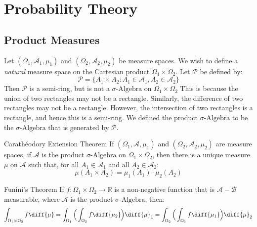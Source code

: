 \chapter{Probability Theory}
    \section{Product Measures}
        Let $(\Omega_{1},\mathcal{A}_{1},\mu_{1})$ and
        $(\Omega_{2},\mathcal{A}_{2},\mu_{2})$ be measure spaces. We
        wish to define a \textit{natural} measure space
        on the Cartesian product $\Omega_{1}\times\Omega_{2}$.
        Let $\mathcal{P}$ be defined by:
        \begin{equation}
            \mathcal{P}=
            \{A_{1}\times{A}_{2}:
                A_{1}\in\mathcal{A}_{1},A_{2}\in\mathcal{A}_{2}\}
        \end{equation}
        Then $\mathcal{P}$ is a semi-ring, but is not a
        $\sigma\textrm{-Algebra}$ on $\Omega_{1}\times\Omega_{2}$
        This is because the union of two rectangles may not be a
        rectangle. Similarly, the difference of two rectangles may not
        be a rectangle. However, the intersection of two rectangles is
        a rectangle, and hence this is a semi-ring.
        We defined the product $\sigma\textrm{-Algebra}$ to be the
        $\sigma\textrm{-Algebra}$ that is generated by $\mathcal{P}$. 
        \begin{ltheorem}{Carath\'{e}odory Extension Theorem}
            If $(\Omega_{1},\mathcal{A},\mu_{1})$ and
            $(\Omega_{2},\mathcal{A}_{2},\mu_{2})$ are measure spaces,
            if $\mathcal{A}$ is the product $\sigma\textrm{-Algebra}$
            on $\Omega_{1}\times\Omega_{2}$, then there is a unique
            measure $\mu$ on $\mathcal{A}$ such that, for all
            $A_{1}\in\mathcal{A}_{1}$ and all
            $A_{2}\in\mathcal{A}_{2}$:
            \begin{equation}
                \mu(A_{1}\times{A}_{2})
                =\mu_{1}(A_{1})\cdot\mu_{2}(A_{2})
            \end{equation}
        \end{ltheorem}
        \begin{ltheorem}{Funini's Theorem}
            If $f:\Omega_{1}\times\Omega_{2}\rightarrow\mathbb{R}$
            is a non-negative function that is
            $\mathcal{A}-\mathcal{B}$ measurable, where
            $\mathcal{A}$ is the product $\sigma\textrm{-Algebra}$,
            then:
            \begin{equation}
                \int_{\Omega_{1}\times\Omega_{2}}f\diff{\mu}=
                \int_{\Omega_{1}}\Big(
                    \int_{\Omega_{2}}f\diff{\mu_{2}}
                \Big)\diff{\mu}_{1}
                =\int_{\Omega_{2}}
                    \Big(\int_{\Omega_{1}}f\diff{\mu_{1}}\Big)
                    \diff{\mu}_{2}
            \end{equation}
        \end{ltheorem}
